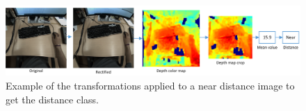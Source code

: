\documentclass[10pt,a4paper,twocolumn,twoside]{article}
\begin{document}
	\begin{figure}
		\centering
		\includegraphics[width=1\linewidth]{img/pipelineNearSimple.png}
		\caption{Example of the transformations applied to a near distance image to get the distance class.}
		\label{fig:add:pattern}
	\end{figure}
	
\end{document}
